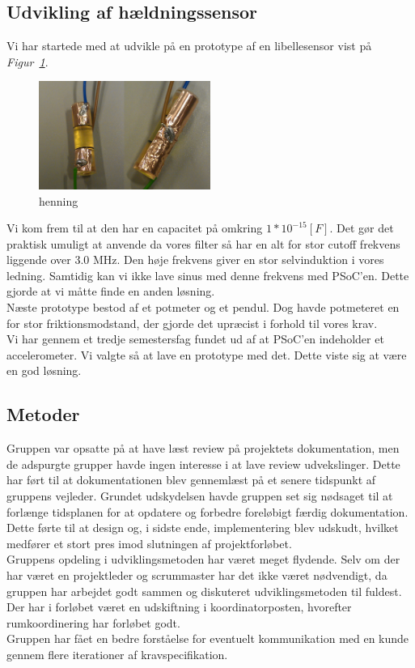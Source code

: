 \subsection{Udvikling af hældningssensor}
Vi har startede med at udvikle på en prototype af en libellesensor vist på \textit{Figur~\ref{fig:libelle}}.
\begin{figure}[hbpt]
\centering
\includegraphics[width=0.5\textwidth]{billeder/libellesensor1}
\caption{henning}
\label{fig:libelle}
\end{figure}
Vi kom frem til at den har en capacitet på omkring $1*10^{-15}[F]$. Det gør det praktisk umuligt at anvende da vores filter så har en alt for stor cutoff frekvens liggende over 3.0 MHz. Den høje frekvens giver en stor selvinduktion i vores ledning. Samtidig kan vi ikke lave sinus med denne frekvens med PSoC'en. Dette gjorde at vi måtte finde en anden løsning.\\
Næste prototype bestod af et potmeter og et pendul. Dog havde potmeteret en for stor friktionsmodstand, der gjorde det upræcist i forhold til vores krav.\\
Vi har gennem et tredje semestersfag fundet ud af at PSoC'en indeholder et accelerometer. Vi valgte så at lave en prototype med det. Dette viste sig at være en god løsning.

\subsection{Metoder}
Gruppen var opsatte på at have læst review på projektets dokumentation, men de adspurgte grupper havde ingen interesse i at lave review udvekslinger. Dette har ført til at dokumentationen blev gennemlæst på et senere tidspunkt af gruppens vejleder. Grundet udskydelsen havde gruppen set sig nødsaget til at forlænge tidsplanen for at opdatere og forbedre foreløbigt færdig dokumentation. Dette førte til at design og, i sidste ende, implementering blev udskudt, hvilket medfører et stort pres imod slutningen af projektforløbet.\\
Gruppens opdeling i udviklingsmetoden har været meget flydende. Selv om der har været en projektleder og scrummaster har det ikke været nødvendigt, da gruppen har arbejdet godt sammen og diskuteret udviklingsmetoden til fuldest. Der har i forløbet været en udskiftning i koordinatorposten, hvorefter rumkoordinering har forløbet godt.\\
Gruppen har fået en bedre forståelse for eventuelt kommunikation med en kunde gennem flere iterationer af kravspecifikation.

